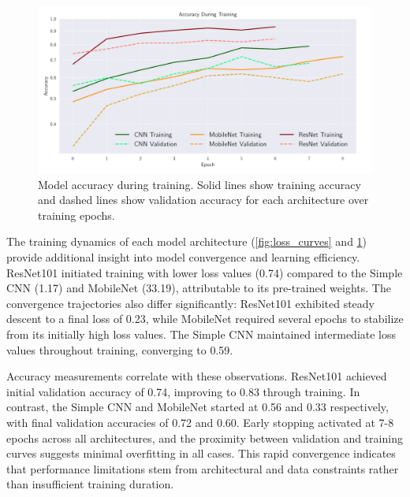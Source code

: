 \begin{figure}[h!]
    \begin{minipage}{\textwidth}
        \centering
        \includegraphics[width = \textwidth]{../figs/cnn_accuracy.pdf}
        \caption{Model accuracy during training. Solid lines show training accuracy and dashed lines show validation accuracy for each architecture over training epochs.}
        \label{fig:accuracy_curves}
    \end{minipage}
\end{figure}
\twocolumngrid

The training dynamics of each model architecture (\cref{fig:loss_curves} and \cref{fig:accuracy_curves}) provide additional insight into model convergence and learning efficiency. ResNet101 initiated training with lower loss values (0.74) compared to the Simple CNN (1.17) and MobileNet (33.19), attributable to its pre-trained weights. The convergence trajectories also differ significantly: ResNet101 exhibited steady descent to a final loss of 0.23, while MobileNet required several epochs to stabilize from its initially high loss values. The Simple CNN maintained intermediate loss values throughout training, converging to 0.59.

Accuracy measurements correlate with these observations. ResNet101 achieved initial validation accuracy of 0.74, improving to 0.83 through training. In contrast, the Simple CNN and MobileNet started at 0.56 and 0.33 respectively, with final validation accuracies of 0.72 and 0.60. Early stopping activated at 7-8 epochs across all architectures, and the proximity between validation and training curves suggests minimal overfitting in all cases. This rapid convergence indicates that performance limitations stem from architectural and data constraints rather than insufficient training duration.
